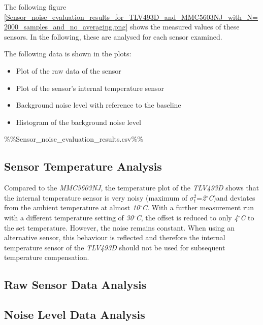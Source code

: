 The following figure
\ref{Sensor_noise_evaluation_results_for_TLV493D_and_MMC5603NJ_with_N=2000_samples_and_no_averaging.png}
shows the measured values of these sensors. In the following, these are
analysed for each sensor examined.

The following data is shown in the plots:

\begin{itemize}
\tightlist
\item
  Plot of the raw data of the sensor
\item
  Plot of the sensor's internal temperature sensor
\item
  Background noise level with reference to the baseline
\item
  Histogram of the background noise level
\end{itemize}

\%\%Sensor\_noise\_evaluation\_results.csv\%\%

\hypertarget{sensor-temperature-analysis}{%
\subsection{Sensor Temperature
Analysis}\label{sensor-temperature-analysis}}

Compared to the \emph{MMC5603NJ}, the temperature plot of the
\emph{TLV493D} shows that the internal temperature sensor is very noisy
(maximum of \(\sigma^2_{t}\)=\emph{2\(^{\circ}\)C})and deviates from the
ambient temperature at almost \emph{10\(^{\circ}\)C}. With a further
measurement run with a different temperature setting of
\emph{30\(^{\circ}\)C}, the offset is reduced to only
\emph{4\(^{\circ}\)C} to the set temperature. However, the noise remains
constant. When using an alternative sensor, this behaviour is reflected
and therefore the internal temperature sensor of the \emph{TLV493D}
should not be used for subsequent temperature compensation.

\hypertarget{raw-sensor-data-analysis}{%
\subsection{Raw Sensor Data Analysis}\label{raw-sensor-data-analysis}}

\hypertarget{noise-level-data-analysis}{%
\subsection{Noise Level Data Analysis}\label{noise-level-data-analysis}}

